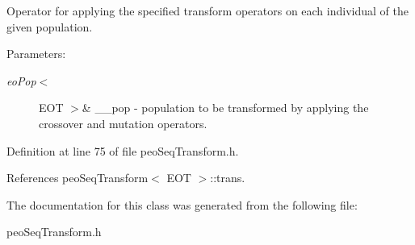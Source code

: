 Operator for applying the specified transform operators on each individual of the given population. 

\begin{Desc}
\item[Parameters:]
\begin{description}
\item[{\em eo\-Pop$<$}]EOT $>$\& \_\-\_\-pop - population to be transformed by applying the crossover and mutation operators. \end{description}
\end{Desc}


Definition at line 75 of file peo\-Seq\-Transform.h.

References peo\-Seq\-Transform$<$ EOT $>$::trans.

The documentation for this class was generated from the following file:\begin{CompactItemize}
\item 
peo\-Seq\-Transform.h\end{CompactItemize}
